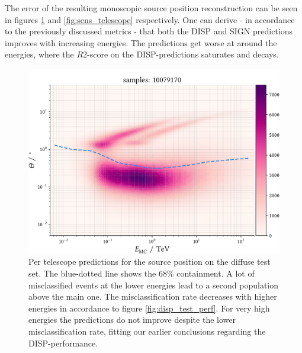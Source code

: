 The error of the resulting monoscopic source position reconstruction 
can be seen in figures \ref{fig:sens_telescope_test} and \ref{fig:sens_telescope}
respectively.
One can derive - in accordance to the previously discussed metrics - 
that both the DISP and SIGN predictions improves with increasing energies.
The predictions get worse at around the energies, where the $R2$-score
on the DISP-predictions saturates and decays.

\begin{figure}
    \centering
    \captionsetup{width=0.9\linewidth}
    \includegraphics[width=.9\textwidth]{../analysis/plots/test/tel_vs_energy.pdf}
    \caption{Per telescope predictions for the source position on the diffuse test set.
    The blue-dotted line shows the 68\% containment. 
    A lot of misclassified events at the lower energies
    lead to a second population above the main one.
    The misclassification rate decreases with higher energies 
    in accordance to figure \ref{fig:disp_test_perf}.
    For very high energies the predictions do not improve despite the lower 
    misclassification rate, fitting our earlier conclusions regarding the DISP-performance.}
    \label{fig:sens_telescope_test}
\end{figure}

